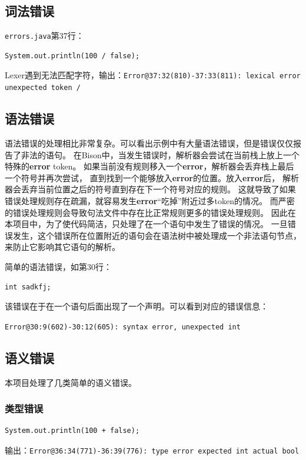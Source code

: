 \documentclass[a4paper]{article}
\begin{document}
\subsection{词法错误}
{\tt errors.java}第37行：
\begin{lstlisting}[style=minijava]
    System.out.println(100 / false);
\end{lstlisting} \par
Lexer遇到无法匹配字符，输出：{\tt Error@37:32(810)-37:33(811): lexical error unexpected token /}

\subsection{语法错误}
语法错误的处理相比非常复杂。可以看出示例中有大量语法错误，但是错误仅仅报告了非法的语句。
在Bison中，当发生错误时，解析器会尝试在当前栈上放上一个特殊的{\bf error} token。
如果当前没有规则移入一个{\bf error}，解析器会丢弃栈上最后一个符号并再次尝试，
直到找到一个能够放入{\bf error}的位置。放入{\bf error}后，
解析器会丢弃当前位置之后的符号直到存在下一个符号对应的规则。
这就导致了如果错误处理规则存在疏漏，就容易发生{\bf error}“吃掉”附近过多token的情况。
而严密的错误处理规则会导致句法文件中存在比正常规则更多的错误处理规则。
因此在本项目中，为了使代码简洁，只处理了在一个语句中发生了错误的情况。
一旦错误发生，这个错误所在位置附近的语句会在语法树中被处理成一个非法语句节点，来防止它影响其它语句的解析。

简单的语法错误，如第30行：
\begin{lstlisting}[style=minijava]
    int sadkfj;
\end{lstlisting} \par
该错误在于在一个语句后面出现了一个声明。可以看到对应的错误信息：\par
{\tt Error@30:9(602)-30:12(605): syntax error, unexpected int}

\subsection{语义错误}
本项目处理了几类简单的语义错误。
\subsubsection{类型错误}
\begin{lstlisting}[style=minijava]
    System.out.println(100 + false);
\end{lstlisting} \par
输出：{\tt Error@36:34(771)-36:39(776): type error expected int actual bool}
\end{document}

